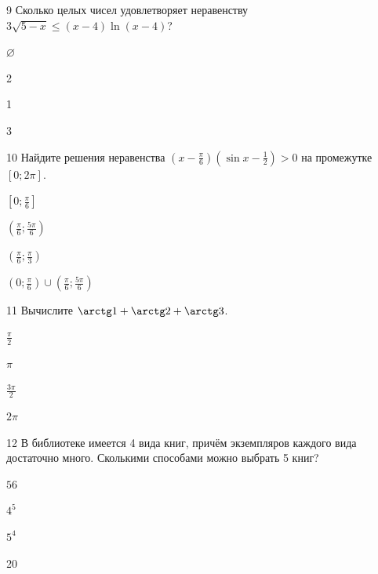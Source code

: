 \documentclass[14pt]{article}
\begin{document}
\begin{questionbox}{9}
    Сколько целых чисел удовлетворяет неравенству \(3\sqrt{5-x} \le (x-4)\ln(x-4)\)?
    \begin{options}
        \item \(\varnothing\)
        \item 2
        \item 1
        \item 3
    \end{options}
\end{questionbox}

\begin{questionbox}{10}
    Найдите решения неравенства \(\left(x - \frac{\pi}{6}\right)\left(\sin x - \frac{1}{2}\right) > 0\) на промежутке \([0; 2\pi]\).
    \begin{options}
        \item \(\left[0; \frac{\pi}{6}\right]\)
        \item \(\left(\frac{\pi}{6}; \frac{5\pi}{6}\right)\)
        \item \(\left(\frac{\pi}{6}; \frac{\pi}{3}\right)\)
        \item \(\left(0; \frac{\pi}{6}\right) \cup \left(\frac{\pi}{6}; \frac{5\pi}{6}\right)\)
    \end{options}
\end{questionbox}

\begin{questionbox}{11}
    Вычислите \(\arctg 1 + \arctg 2 + \arctg 3\).
    \begin{options}
        \item \(\frac{\pi}{2}\)
        \item \(\pi\)
        \item \(\frac{3\pi}{2}\)
        \item \(2\pi\)
    \end{options}
\end{questionbox}

\begin{questionbox}{12}
   В библиотеке имеется 4 вида книг, причём экземпляров каждого вида достаточно много. Сколькими способами можно выбрать 5 книг?
    \begin{options}
        \item \(56\)
        \item \(4^5\)
        \item \(5^4\)
        \item 20
    \end{options}
\end{questionbox}
\end{document}
